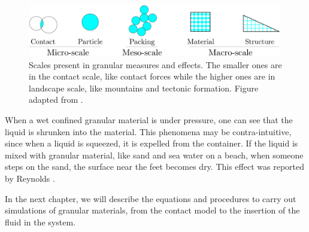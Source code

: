\begin{figure}
    \centering
    \includegraphics[width=0.99\textwidth]{04-figuras/Granular_Scales.png}
    \caption{Scales present in granular measures and effects. The smaller ones are in the contact scale, like contact forces while the higher ones are in landscape scale, like mountains and tectonic formation. Figure adapted from \cite{Modeling_Granular_Materials}.}
    \label{fig:granular_scales}
\end{figure}


    When a wet confined granular material is under pressure, one can see that the liquid is shrunken into the material. This phenomena may be contra-intuitive, since when a liquid is squeezed, it is expelled from the container. If the liquid is mixed with granular material, like sand and sea water on a beach, when someone steps on the sand, the surface near the feet becomes dry. This effect was reported by Reynolds \cite{On_the_dilatancy}.

    

    In the next chapter, we will describe the equations and procedures to carry out simulations of granular materials, from the contact model to the insertion of the fluid in the system. 
